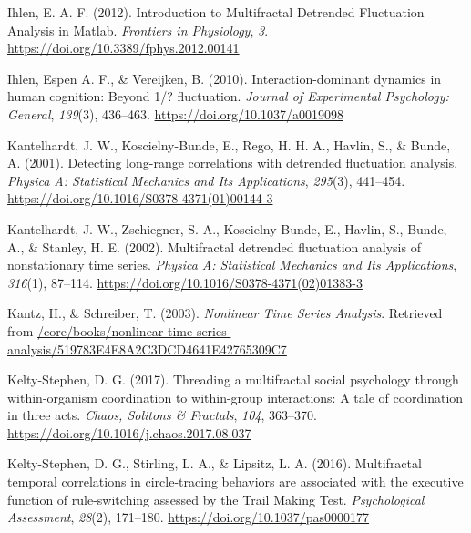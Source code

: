 \documentclass[
  man]{apa6}
\newlength{\cslhangindent}
\newlength{\cslentryspacingunit} %
\newenvironment{CSLReferences}[2] %
 {%
  \setlength{\parindent}{0pt}
  \ifodd #1
  \let\oldpar\par
  \def\par{\hangindent=\cslhangindent\oldpar}
  \fi
  \setlength{\parskip}{#2\cslentryspacingunit}
 }%
 {}
\begin{document}
\begin{CSLReferences}{1}{0}
\leavevmode{}%
Ihlen, E. A. F. (2012). Introduction to {Multifractal} {Detrended} {Fluctuation} {Analysis} in {Matlab}. \emph{Frontiers in Physiology}, \emph{3}. \url{https://doi.org/10.3389/fphys.2012.00141}

\leavevmode{}%
Ihlen, Espen A. F., \& Vereijken, B. (2010). Interaction-dominant dynamics in human cognition: Beyond 1/{\textflorin}? fluctuation. \emph{Journal of Experimental Psychology: General}, \emph{139}(3), 436--463. \url{https://doi.org/10.1037/a0019098}

\leavevmode{}%
Kantelhardt, J. W., Koscielny-Bunde, E., Rego, H. H. A., Havlin, S., \& Bunde, A. (2001). Detecting long-range correlations with detrended fluctuation analysis. \emph{Physica A: Statistical Mechanics and Its Applications}, \emph{295}(3), 441--454. \url{https://doi.org/10.1016/S0378-4371(01)00144-3}

\leavevmode{}%
Kantelhardt, J. W., Zschiegner, S. A., Koscielny-Bunde, E., Havlin, S., Bunde, A., \& Stanley, H. E. (2002). Multifractal detrended fluctuation analysis of nonstationary time series. \emph{Physica A: Statistical Mechanics and Its Applications}, \emph{316}(1), 87--114. \url{https://doi.org/10.1016/S0378-4371(02)01383-3}

\leavevmode{}%
Kantz, H., \& Schreiber, T. (2003). \emph{Nonlinear Time Series Analysis}. Retrieved from \href{https:///core/books/nonlinear-time-series-analysis/519783E4E8A2C3DCD4641E42765309C7}{/core/books/nonlinear-time-series-analysis/519783E4E8A2C3DCD4641E42765309C7}

\leavevmode{}%
Kelty-Stephen, D. G. (2017). Threading a multifractal social psychology through within-organism coordination to within-group interactions: {A} tale of coordination in three acts. \emph{Chaos, Solitons \& Fractals}, \emph{104}, 363--370. \url{https://doi.org/10.1016/j.chaos.2017.08.037}

\leavevmode{}%
Kelty-Stephen, D. G., Stirling, L. A., \& Lipsitz, L. A. (2016). Multifractal temporal correlations in circle-tracing behaviors are associated with the executive function of rule-switching assessed by the {Trail} {Making} {Test}. \emph{Psychological Assessment}, \emph{28}(2), 171--180. \url{https://doi.org/10.1037/pas0000177}


\end{CSLReferences}
\end{document}

